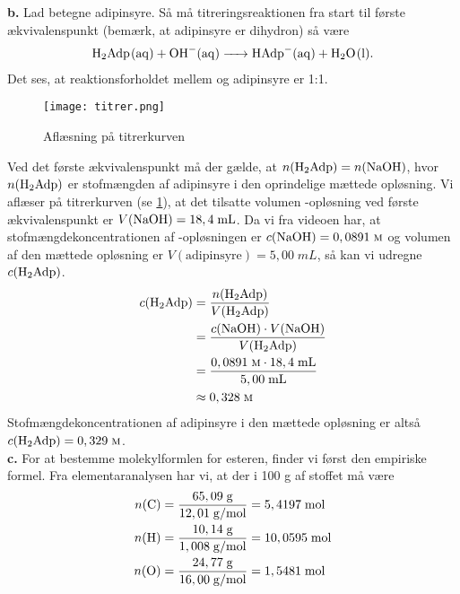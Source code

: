 \documentclass{report}
\begin{document}
\textbf{b.}
Lad  betegne adipinsyre.
Så må titreringsreaktionen fra start til første ækvivalenspunkt (bemærk, at adipinsyre er dihydron) så være
\begin{equation*}
\begin{split}
  \ce{H2Adp(aq) + OH-(aq) -> HAdp-(aq) + H2O(l)}.
\end{split}
\end{equation*}
Det ses, at reaktionsforholdet mellem  og adipinsyre er 1:1.
\begin{figure}[H]
\begin{center}
  \texttt{[image: titrer.png]}
\end{center}
\caption{Aflæsning på titrerkurven}
\label{fig:titrer}
\end{figure}
Ved det første ækvivalenspunkt må der gælde, at $n(\ce{H2Adp})=n(\ce{NaOH} )$, hvor $n(\ce{H2Adp} )$ er stofmængden af adipinsyre i den oprindelige mættede opløsning. 
Vi aflæser på titrerkurven (se \cref{fig:titrer}), at det tilsatte volumen -opløsning ved første ækvivalenspunkt er $V(\ce{NaOH} )= 18,4 \;\unit{mL}$.
Da vi fra videoen har, at stofmængdekoncentrationen af -opløsningen er $c(\ce{NaOH} )=0,0891 \;\unit{\textsc{m}} $ og volumen af den mættede opløsning er $V(\text{adipinsyre})=5,00 \;\unit{mL}$, så kan vi udregne $c(\ce{H2Adp})$.
\begin{equation*}
\begin{split}
  c(\ce{H2Adp})&=\frac{n(\ce{H2Adp} )}{V(\ce{H2Adp})}\\
  &=\frac{c(\ce{NaOH}) \cdot V(\ce{NaOH})}{V(\ce{H2Adp} )}\\
  &=\frac{0,0891 \;\unit{\textsc{m}} \cdot 18,4 \;\unit{mL} }{5,00 \;\unit{mL} }\\
  &\approx 0,328 \;\unit{\textsc{m}}
\end{split}
\end{equation*}
Stofmængdekoncentrationen af adipinsyre i den mættede opløsning er altså $c(\ce{H2Adp})=0,329 \;\unit{\textsc{m}} $.\\[1ex]
\textbf{c.}
For at bestemme molekylformlen for esteren, finder vi først den empiriske formel.
Fra elementaranalysen har vi, at der i 100 g af stoffet må være
\begin{equation*}
\begin{split}
  n(\ce{C} )&=\frac{65,09 \;\unit{g} }{12,01 \;\unit{g/mol} }= 5,4197 \;\unit{mol} \\
  n(\ce{H} )&=\frac{10,14 \;\unit{g} }{1,008 \;\unit{g/mol} }= 10,0595 \;\unit{mol} \\
  n(\ce{O})&=\frac{24,77 \;\unit{g} }{16,00 \;\unit{g/mol} }= 1,5481 \;\unit{mol} 
\end{split}
\end{equation*}
\end{document}
